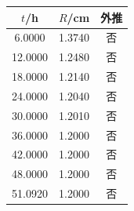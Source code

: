 \begin{tabular}{ccc}
\toprule
$t$/h & $R$/cm & 外推 \\
\midrule
6.0000 & 1.3740 & 否 \\
12.0000 & 1.2480 & 否 \\
18.0000 & 1.2140 & 否 \\
24.0000 & 1.2040 & 否 \\
30.0000 & 1.2010 & 否 \\
36.0000 & 1.2000 & 否 \\
42.0000 & 1.2000 & 否 \\
48.0000 & 1.2000 & 否 \\
51.0920 & 1.2000 & 否 \\
\bottomrule
\end{tabular}
